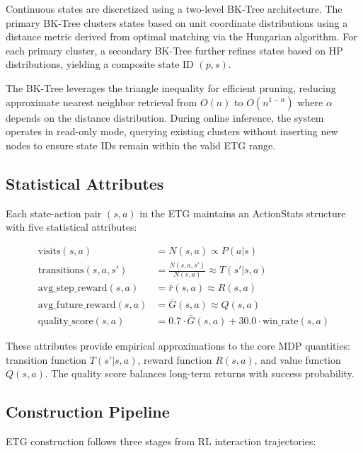 \documentclass[letterpaper]{article}
\begin{document}
Continuous states are discretized using a two-level BK-Tree architecture. The primary BK-Tree clusters states based on unit coordinate distributions using a distance metric derived from optimal matching via the Hungarian algorithm. For each primary cluster, a secondary BK-Tree further refines states based on HP distributions, yielding a composite state ID $(p, s)$.

The BK-Tree leverages the triangle inequality for efficient pruning, reducing approximate nearest neighbor retrieval from $O(n)$ to $O(n^{1-\alpha})$ where $\alpha$ depends on the distance distribution. During online inference, the system operates in read-only mode, querying existing clusters without inserting new nodes to ensure state IDs remain within the valid ETG range.

\subsection{Statistical Attributes}

Each state-action pair $(s, a)$ in the ETG maintains an ActionStats structure with five statistical attributes:

\begin{align}
	\text{visits}(s,a)              & = N(s,a) \propto P(a|s)                                     \\
	\text{transitions}(s,a,s')      & = \frac{N(s,a,s')}{N(s,a)} \approx T(s'|s,a)                \\
	\text{avg\_step\_reward}(s,a)   & = \bar{r}(s,a) \approx R(s,a)                               \\
	\text{avg\_future\_reward}(s,a) & = \bar{G}(s,a) \approx Q(s,a)                               \\
	\text{quality\_score}(s,a)      & = 0.7 \cdot \bar{G}(s,a) + 30.0 \cdot \text{win\_rate}(s,a)
\end{align}

These attributes provide empirical approximations to the core MDP quantities: transition function $T(s'|s,a)$, reward function $R(s,a)$, and value function $Q(s,a)$. The quality score balances long-term returns with success probability.

\subsection{Construction Pipeline}

ETG construction follows three stages from RL interaction trajectories:
\end{document}
